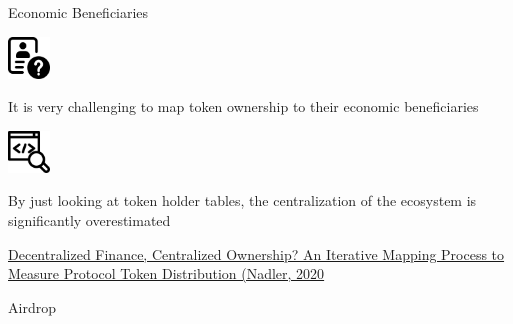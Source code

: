 \documentclass[handout]{beamer}
\begin{document}
\begin{frame}{Economic Beneficiaries}
\vspace{2 em}
		\begin{minipage}{0.2\textwidth}
			\begin{center}
				\includegraphics[height=3em]{../assets/images/unknown.png}
			\end{center}
		\end{minipage}
		\hspace{1 em}
		\begin{minipage}{0.72\textwidth}
		It is very challenging to map token ownership to their economic beneficiaries
		\end{minipage}
		\pause
		\vspace{2 em}
		

		\begin{minipage}{0.2\textwidth}
			\begin{center}
				\includegraphics[height=3em]{../assets/images/code-review.png}
			\end{center}
		\end{minipage}
		\hspace{1 em}
		\begin{minipage}{0.72\textwidth}
		By just looking at token holder tables, the centralization of the ecosystem is significantly overestimated
		\end{minipage}
		\pause
		\vspace{3em}		
		
		\pause
		
		
		\link \href{https://arxiv.org/pdf/2012.09306}{Decentralized Finance, Centralized Ownership? An Iterative Mapping Process to Measure Protocol Token Distribution (Nadler, 2020}
\end{frame}



\begin{frame}{Airdrop}
\begin{figure}
\scalebox{0.7}{
	\begin{tikzpicture}
		
	\end{tikzpicture}	
}
\end{figure}

\end{frame}
\end{document}
